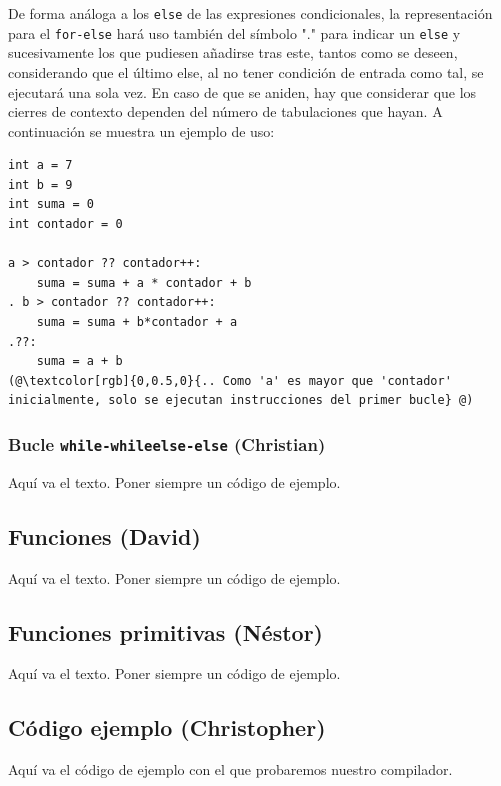\documentclass[11pt, english]{article}
\begin{document}
De forma análoga a los \texttt{else} de las expresiones condicionales, la representación para el \texttt{for-else} hará uso también del símbolo "." para indicar un \texttt{else} y sucesivamente los que pudiesen añadirse tras este, tantos como se deseen, considerando que el último else, al no tener condición de entrada como tal, se ejecutará una sola vez. En caso de que se aniden, hay que considerar que los cierres de contexto dependen del número de tabulaciones que hayan. A continuación se muestra un ejemplo de uso:
\begin{lstlisting}[frame=single]
int a = 7
int b = 9
int suma = 0
int contador = 0

a > contador ?? contador++:
	suma = suma + a * contador + b
. b > contador ?? contador++:
	suma = suma + b*contador + a
.??:
	suma = a + b
(@\textcolor[rgb]{0,0.5,0}{.. Como 'a' es mayor que 'contador' inicialmente, solo se ejecutan instrucciones del primer bucle} @)
\end{lstlisting}

\subsubsection{Bucle \texttt{while-whileelse-else} (Christian)}\label{while}
Aquí va el texto. Poner siempre un código de ejemplo.


\subsection{Funciones (David)}\label{functions}
Aquí va el texto. Poner siempre un código de ejemplo.
\newpage

\subsection{Funciones primitivas (Néstor)}\label{primitive-functions}
Aquí va el texto. Poner siempre un código de ejemplo.
\newpage

\subsection{Código ejemplo (Christopher)}\label{example-code}
Aquí va el código de ejemplo con el que probaremos nuestro compilador.
\end{document}
